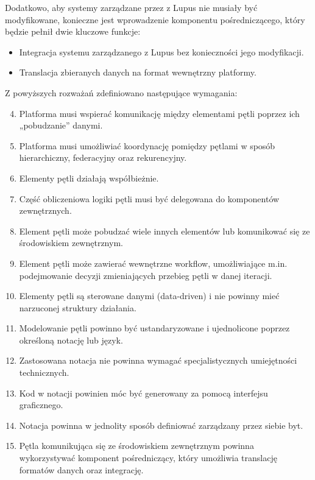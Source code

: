 Dodatkowo, aby systemy zarządzane przez z Lupus nie musiały być modyfikowane, konieczne jest wprowadzenie komponentu pośredniczącego, który będzie pełnił dwie kluczowe funkcje:
\begin{itemize}
    \item Integracja systemu zarządzanego z Lupus bez konieczności jego modyfikacji.
    \item Translacja zbieranych danych na format wewnętrzny platformy.
\end{itemize}
Z powyższych rozważań zdefiniowano następujące wymagania:
\begin{enumerate}
    \setcounter{enumi}{3}
    \item \label{req:4} Platforma musi wspierać komunikację między elementami pętli poprzez ich „pobudzanie” danymi.
    \item \label{req:5} Platforma musi umożliwiać koordynację pomiędzy pętlami w sposób hierarchiczny, federacyjny oraz rekurencyjny.
    \item \label{req:6} Elementy pętli działają współbieżnie.
    \item \label{req:7} Część obliczeniowa logiki pętli musi być delegowana do komponentów zewnętrznych.
    \item \label{req:8} Element pętli może pobudzać wiele innych elementów lub komunikować się ze środowiskiem zewnętrznym.
    \item \label{req:9} Element pętli może zawierać wewnętrzne workflow, umożliwiające m.in. podejmowanie decyzji zmieniających przebieg pętli w danej iteracji.
    \item \label{req:10} Elementy pętli są sterowane danymi (data-driven) i nie powinny mieć narzuconej struktury działania.
    \item \label{req:11} Modelowanie pętli powinno być ustandaryzowane i ujednolicone poprzez określoną notację lub język.
    \item \label{req:12} Zastosowana notacja nie powinna wymagać specjalistycznych umiejętności technicznych.
    \item \label{req:13} Kod w notacji powinien móc być generowany za pomocą interfejsu graficznego.
    \item \label{req:14} Notacja powinna w jednolity sposób definiować zarządzany przez siebie byt.
    \item \label{req:15} Pętla komunikująca się ze środowiskiem zewnętrznym powinna wykorzystywać komponent pośredniczący, który umożliwia translację formatów danych oraz integrację.
\end{enumerate}

